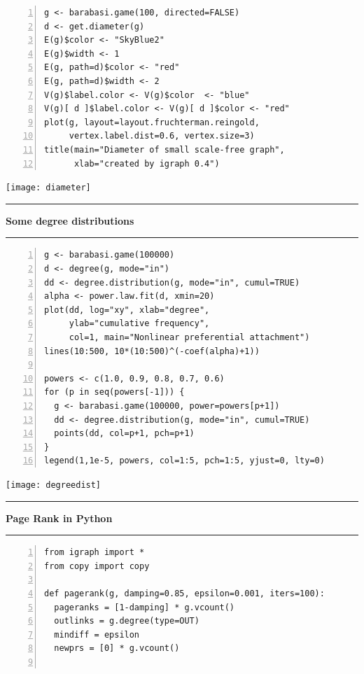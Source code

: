 \documentclass[a0]{sciposter}
\begin{document}
\begin{multicols}{3}
\begin{Verbatim}[fontsize=\small,numbers=left]
g <- barabasi.game(100, directed=FALSE)
d <- get.diameter(g)
E(g)$color <- "SkyBlue2"
E(g)$width <- 1
E(g, path=d)$color <- "red"
E(g, path=d)$width <- 2
V(g)$label.color <- V(g)$color  <- "blue"
V(g)[ d ]$label.color <- V(g)[ d ]$color <- "red"
plot(g, layout=layout.fruchterman.reingold, 
     vertex.label.dist=0.6, vertex.size=3)
title(main="Diameter of small scale-free graph",
      xlab="created by igraph 0.4")
\end{Verbatim}

\begin{center}
\texttt{[image: diameter]}
\end{center}

\vspace{20pt}\hrule\vspace{20pt}
\centerline{\bf Some degree distributions}
\vspace{20pt}\hrule\vspace{20pt}

\begin{Verbatim}[fontsize=\small,numbers=left]
g <- barabasi.game(100000)
d <- degree(g, mode="in")
dd <- degree.distribution(g, mode="in", cumul=TRUE)
alpha <- power.law.fit(d, xmin=20)
plot(dd, log="xy", xlab="degree", 
     ylab="cumulative frequency",
     col=1, main="Nonlinear preferential attachment")
lines(10:500, 10*(10:500)^(-coef(alpha)+1))

powers <- c(1.0, 0.9, 0.8, 0.7, 0.6)
for (p in seq(powers[-1])) {
  g <- barabasi.game(100000, power=powers[p+1])
  dd <- degree.distribution(g, mode="in", cumul=TRUE)
  points(dd, col=p+1, pch=p+1)
}
legend(1,1e-5, powers, col=1:5, pch=1:5, yjust=0, lty=0)
\end{Verbatim}

\begin{center}
\texttt{[image: degreedist]}
\end{center}

\columnbreak
\vspace{20pt}\hrule\vspace{20pt}
\centerline{\bf Page Rank in Python}
\vspace{20pt}\hrule\vspace{20pt}

\begin{Verbatim}[fontsize=\small,numbers=left]
from igraph import *
from copy import copy

def pagerank(g, damping=0.85, epsilon=0.001, iters=100):
  pageranks = [1-damping] * g.vcount()
  outlinks = g.degree(type=OUT)
  mindiff = epsilon
  newprs = [0] * g.vcount()
    

\end{Verbatim}
\end{multicols}
\end{document}
